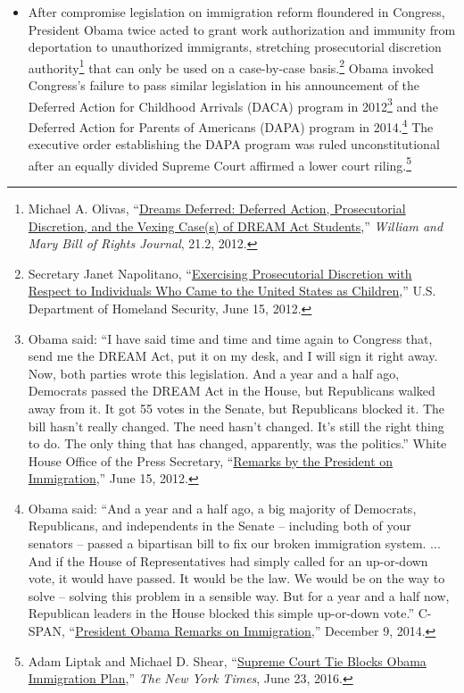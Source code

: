 \documentclass[12pt]{article}
\begin{document}
\begin{itemize}
\item After compromise legislation on immigration reform floundered in Congress, President Obama twice acted to grant work authorization and immunity from deportation to unauthorized immigrants, stretching prosecutorial discretion authority\footnote{Michael A. Olivas, ``\href{https://core.ac.uk/download/pdf/73973732.pdf}{Dreams Deferred: Deferred Action, Prosecutorial Discretion, and the Vexing Case(s) of DREAM Act Students},'' \emph{William and Mary Bill of Rights Journal}, 21.2, 2012.} that can only be used on a case-by-case basis.\footnote{Secretary Janet Napolitano, ``\href{https://www.dhs.gov/xlibrary/assets/s1-exercising-prosecutorial-discretion-individuals-who-came-to-us-as-children.pdf}{Exercising Prosecutorial Discretion with Respect to Individuals Who Came to the United States as Children},'' U.S. Department of Homeland Security, June 15, 2012.} Obama invoked Congress's failure to pass similar legislation in his announcement of the Deferred Action for Childhood Arrivals (DACA) program in 2012\footnote{Obama said: ``I have said time and time and time again to Congress that, send me the DREAM Act, put it on my desk, and I will sign it right away. Now, both parties wrote this legislation. And a year and a half ago, Democrats passed the DREAM Act in the House, but Republicans walked away from it. It got 55 votes in the Senate, but Republicans blocked it. The bill hasn't really changed. The need hasn't changed. It's still the right thing to do. The only thing that has changed, apparently, was the politics.'' White House Office of the Press Secretary, ``\href{https://obamawhitehouse.archives.gov/the-press-office/2012/06/15/remarks-president-immigration}{Remarks by the President on Immigration},'' June 15, 2012.} and the Deferred Action for Parents of Americans (DAPA) program in 2014.\footnote{Obama said: ``And a year and a half ago, a big majority of Democrats, Republicans, and independents in the Senate -- including both of your senators -- passed a bipartisan bill to fix our broken immigration system. ... And if the House of Representatives had simply called for an up-or-down vote, it would have passed. It would be the law. We would be on the way to solve -- solving this problem in a sensible way. But for a year and a half now, Republican leaders in the House blocked this simple up-or-down vote.'' C-SPAN, ``\href{https://www.c-span.org/video/?323154-2/president-obama-remarks-immigration}{President Obama Remarks on Immigration},'' December 9, 2014.} The executive order establishing the DAPA program was ruled unconstitutional after an equally divided Supreme Court affirmed a lower court riling.\footnote{Adam Liptak and Michael D. Shear, ``\href{https://www.nytimes.com/2016/06/24/us/supreme-court-immigration-obama-dapa.html}{Supreme Court Tie Blocks Obama Immigration Plan},'' \emph{The New York Times}, June 23, 2016.}


\end{itemize}
\end{document}
